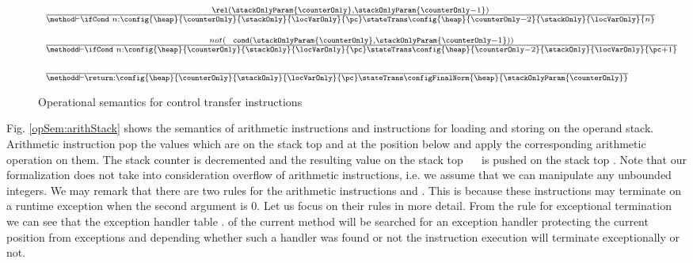 \begin{figure}[ht!] 
\begin{frameit}
 $$ \begin{array}{l}
           {\scriptsize \frac{ \rel ( \stackOnlyParam{\counterOnly}, \stackOnlyParam{\counterOnly - 1}) } 			       		               
                      {\method \vdash \ifCond \ n : \config{\heap }{\counterOnly}{\stackOnly}{\locVarOnly}{\pc}
		                      \stateTrans 
				      \config{\heap}{\counterOnly - 2}{\stackOnly}{\locVarOnly}{n}} 
            } \\    \\
		 {\scriptsize
                 \frac{  not (\mbox{ \rm \texttt{ cond}}( \stackOnlyParam{\counterOnly}, \stackOnlyParam{\counterOnly - 1})) }		                             
                     {\methodd \vdash \ifCond \ n : \config{\heap}{\counterOnly}{\stackOnly}{\locVarOnly}{\pc} 
		                    \stateTrans 
                                    \config{\heap}{\counterOnly - 2}{\stackOnly}{\locVarOnly}{\pc + 1}} } \\ \\
           {\scriptsize \frac{ } 
            {\methodd \vdash \return :\config{\heap}{\counterOnly}{\stackOnly}{\locVarOnly}{\pc} 
		                    \stateTrans 
                                    \configFinalNorm{\heap}{\stackOnlyParam{\counterOnly}}}   }
\end{array}
$$

\caption{\sc Operational semantics for control transfer instructions}
\label{opSem:jump}
\end{frameit}
\end{figure}



 Fig. \ref{opSem:arithStack}  shows the semantics of  arithmetic instructions and instructions for loading and storing on the operand stack. 
 Arithmetic instruction pop the values which are on the stack top \stackOnlyParam{\counterOnly}  and   at the position below
 and apply the corresponding arithmetic operation on them.
 The stack counter is decremented and  the resulting  value on the stack top  \ \op \ \stackOnlyParam{\counterOnly}
 is pushed on the stack  top  . Note that our formalization does not take into consideration overflow of arithmetic instructions, i.e.
 we assume that we can manipulate any unbounded integers.  
 We may remark that there are two rules  for the arithmetic instructions   and . This is because these instructions
 may terminate on a runtime exception when the second argument is 0. Let us focus on their rules in more detail. 
  From the rule for exceptional termination
 we can see that the exception handler table \methodd.\excHandlerTable{} of the current method will be searched 
for an exception handler protecting the current position \pc{} from \ArithExc{} exceptions and depending whether such a handler was
found or not the instruction execution will terminate exceptionally or not. 

